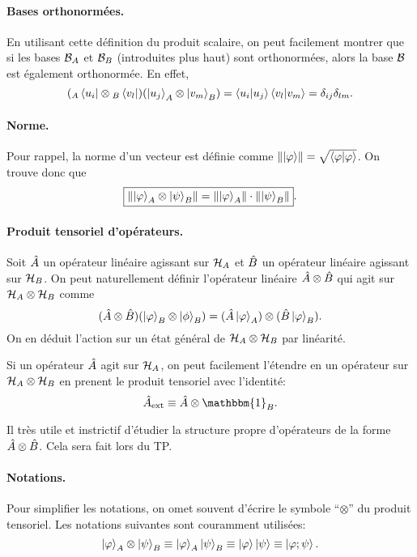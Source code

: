 \documentclass[11pt,a4paper,oneside]{article}
\begin{document}
\paragraph*{Bases orthonormées.} En utilisant cette définition du produit scalaire, on peut facilement montrer que si les bases $\mathcal{B}_A$ et $\mathcal{B}_B$ (introduites plus haut) sont orthonormées, alors la base $\mathcal{B}$ est également orthonormée. En effet,
\begin{equation}
    ({_A}\bra{u_i}\otimes{_B}\bra{v_l})(\ket{u_j}_A\otimes\ket{v_m}_B) = \braket{u_i}{u_j}\braket{v_l}{v_m} = \delta_{ij}\delta_{lm}.
\end{equation}

\paragraph*{Norme.} Pour rappel, la norme d'un vecteur est définie comme $\norm{\ket{\varphi}}=\sqrt{\braket{\varphi}}$. On trouve donc que
\begin{equation}
    \boxed{\norm{\ket{\varphi}_A\otimes\ket{\psi}_B} = \norm{\ket{\varphi}_A}\cdot\norm{\ket{\psi}_B}}.
\end{equation}

\paragraph*{Produit tensoriel d'opérateurs.} Soit $\hat{A}$ un opérateur linéaire agissant sur $\mathcal{H}_A$ et $\hat{B}$ un opérateur linéaire agissant sur $\mathcal{H}_B$. On peut naturellement définir l'opérateur linéaire $\hat{A}\otimes\hat{B}$ qui agit sur $\mathcal{H}_A\otimes\mathcal{H}_B$ comme 
\begin{equation}
    (\hat{A}\otimes\hat{B})(\ket{\varphi}_B\otimes\ket{\phi}_B) = (\hat{A}\ket{\varphi}_A)\otimes(\hat{B}\ket{\varphi}_B).
\end{equation}
On en déduit l'action sur un état général de $\mathcal{H}_A\otimes\mathcal{H}_B$ par linéarité.

Si un opérateur $\hat{A}$ agit sur $\mathcal{H}_A$, on peut facilement l'étendre en un opérateur sur $\mathcal{H}_A\otimes\mathcal{H}_B$ en prenent le produit tensoriel avec l'identité:
\begin{equation}
    \hA_{\text{ext}} \equiv \hA\otimes\mathbbm{1}_B.
\end{equation}

Il très utile et instrictif d'étudier la structure propre d'opérateurs de la forme $\hat{A}\otimes\hat{B}$. Cela sera fait lors du TP.

\paragraph*{Notations.} Pour simplifier les notations, on omet souvent d'écrire le symbole ``$\otimes$'' du produit tensoriel. Les notations suivantes sont couramment utilisées:
\begin{equation}
    \ket{\varphi}_A\otimes\ket{\psi}_B \equiv \ket{\varphi}_A\ket{\psi}_B \equiv \ket{\varphi}\ket{\psi} \equiv \ket{\varphi;\psi}.
\end{equation}
\end{document}
